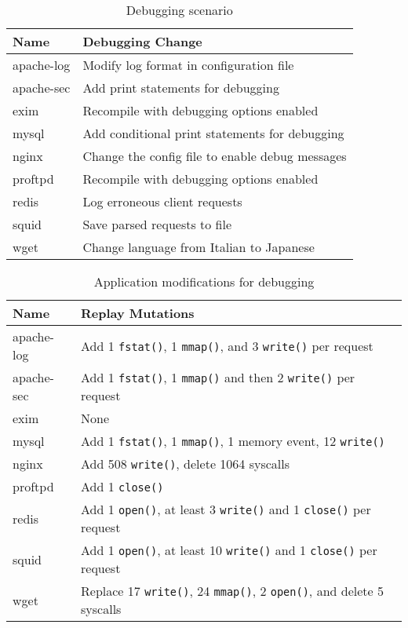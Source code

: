 \begin{table}[h]
\centering
\begin{tabular}{|l|l|}   \hline
{\bf Name}     & {\bf Debugging Change}                          \\ \hline
		apache-log & Modify log format in configuration file         \\ \hline
		apache-sec & Add print statements for debugging              \\ \hline
		exim       & Recompile with debugging options enabled        \\ \hline
		mysql      & Add conditional print statements for debugging  \\ \hline
		nginx      & Change the config file to enable debug messages \\ \hline
		proftpd    & Recompile with debugging options enabled        \\ \hline
		redis      & Log erroneous client requests                   \\ \hline
		squid      & Save parsed requests to file                    \\ \hline
		wget       & Change language from Italian to Japanese        \\ \hline
\end{tabular}
\caption{Debugging scenario}
\label{dora:tab:debugging-scenario}
\end{table}

\begin{table}
\centering
\begin{tabular}{|l|l|}   \hline
{\bf Name}     & {\bf Replay Mutations}                                                           \\ \hline
		apache-log & Add 1 {\tt fstat()}, 1 {\tt mmap()}, and 3 {\tt write()} per request             \\ \hline
		apache-sec & Add 1 {\tt fstat()}, 1 {\tt mmap()} and then 2 {\tt write()} per request         \\ \hline
		exim       & None                                                                             \\ \hline
		mysql      & Add 1 {\tt fstat()}, 1 {\tt mmap()}, 1 memory event, 12 {\tt write()}            \\ \hline
		nginx      & Add 508 {\tt write()}, delete 1064 syscalls                                      \\ \hline
		proftpd    & Add 1 {\tt close()}                                                              \\ \hline
		redis      & Add 1 {\tt open()}, at least 3 {\tt write()} and 1 {\tt close()} per request     \\ \hline
		squid      & Add 1 {\tt open()}, at least 10 {\tt write()} and 1 {\tt close()} per request    \\ \hline
		wget       & Replace 17 {\tt write()}, 24 {\tt mmap()}, 2 {\tt open()}, and delete 5 syscalls \\ \hline
\end{tabular}
\caption{Application modifications for debugging}
\label{dora:tab:debugging-mod}
\end{table}


